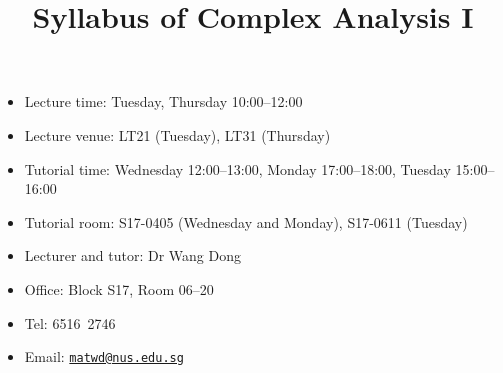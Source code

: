\documentclass[a4paper]{article}
\title{Syllabus of Complex Analysis I}
\date{}
\begin{document}
\maketitle

\begin{minipage}[t]{0.5\linewidth}
  \begin{itemize}[leftmargin=*]
  \item Lecture time: Tuesday, Thursday 10:00--12:00
  \item Lecture venue: LT21 (Tuesday), LT31 (Thursday)
  \item Tutorial time: Wednesday 12:00--13:00, Monday 17:00--18:00, Tuesday 15:00--16:00
  \item Tutorial room: S17-0405 (Wednesday and Monday), S17-0611 (Tuesday)
  \end{itemize}
\end{minipage}
\begin{minipage}[t]{0.4\linewidth}
  \begin{itemize}
  \item Lecturer and tutor: Dr Wang Dong
  \item Office: Block S17, Room 06--20
  \item Tel: 6516\ 2746
  \item Email: \href{mailto:matwd@nus.edu.sg}{\nolinkurl{matwd@nus.edu.sg}}
  \end{itemize}
\end{minipage}
\end{document}
